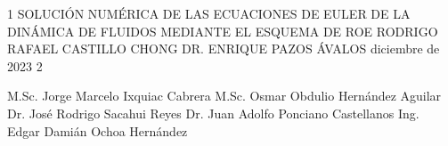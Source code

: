 \documentclass[letterpaper,12pt]{thesisECFM}
\begin{document}
\datosThesis%
{1}%
{SOLUCIÓN NUMÉRICA DE LAS ECUACIONES DE EULER DE LA DINÁMICA DE FLUIDOS MEDIANTE EL ESQUEMA DE ROE}%
{RODRIGO RAFAEL CASTILLO CHONG}%
{DR. ENRIQUE PAZOS ÁVALOS}%
{diciembre de 2023}		%
{2}							%

\examenPrivado%
{M.Sc. Jorge Marcelo Ixquiac Cabrera}%
{M.Sc. Osmar Obdulio Hernández Aguilar}%
{Dr. José Rodrigo Sacahui Reyes}%
{ Dr. Juan Adolfo Ponciano Castellanos}%
{Ing. Edgar Damián Ochoa Hernández}%
{\onehalfspacing	%
	
	
	
	
	\par}
 
\frontmatter    %

{\onehalfspacing	%

\tableofcontents    %





\mainmatter     %








{\backmatter     %


\renewcommand{\bibname}{BIBLIOGRAF\'IA}
\nocite{*}			%


}


%

\par}               %
\end{document}
